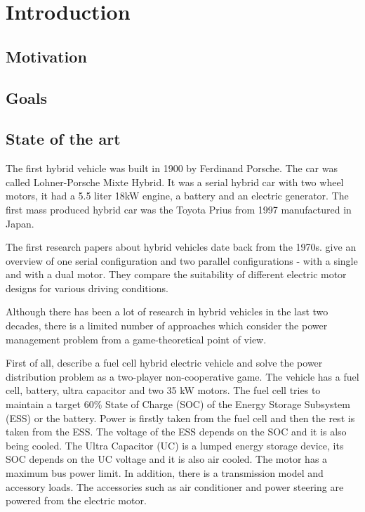 \chapter{Introduction}
\label{chp:intro}

\section{Motivation}

\section{Goals}

\section{State of the art} 
The first hybrid vehicle was built in 1900 by Ferdinand Porsche. The car was called Lohner-Porsche Mixte Hybrid. It was a serial hybrid car with two wheel motors, it had a 5.5 liter 18kW engine, a battery and an electric generator. The first mass produced hybrid car was the Toyota Prius from 1997 manufactured in Japan.

The first research papers about hybrid vehicles date back from the 1970s. \citet{lafrance1973electrical} give an overview of one serial configuration and two parallel configurations - with a single and with a dual motor. They compare the suitability of different electric motor designs for various driving conditions.

Although there has been a lot of research in hybrid vehicles in the last two decades, there is a limited number of approaches which consider the power management problem from a game-theoretical point of view.


First of all, \citet{gielniak2004power} describe a fuel cell hybrid electric vehicle and solve the power distribution problem as a two-player non-cooperative game. The vehicle has a fuel cell, battery, ultra capacitor and two 35 kW motors. The fuel cell tries to maintain a target 60\% State of Charge (SOC) of the Energy Storage Subsystem (ESS) or the battery. Power is firstly taken from the fuel cell and then the rest is taken from the ESS. The voltage of the ESS depends on the SOC and it is also being cooled. The Ultra Capacitor (UC) is a lumped energy storage device, its SOC depends on the UC voltage and it is also air cooled. The motor has a maximum bus power limit. In addition, there is a transmission model and accessory loads. The accessories such as air conditioner and power steering are powered from the electric motor.

